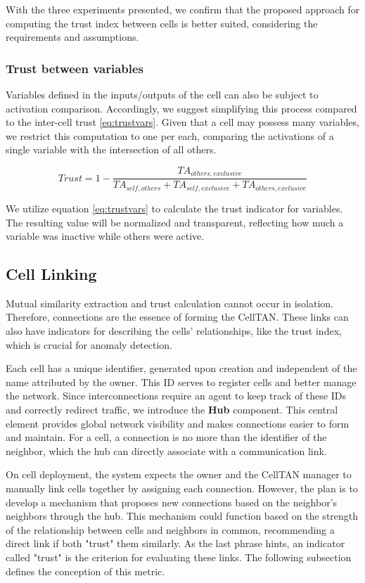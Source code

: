 With the three experiments presented, we confirm that the proposed approach for computing the trust index between cells is better suited, considering the requirements and assumptions.

\subsubsection{Trust between variables}

Variables defined in the inputs/outputs of the cell can also be subject to activation comparison. Accordingly, we suggest simplifying this process compared to the inter-cell trust \ref{eq:trustvars}. Given that a cell may possess many variables, we restrict this computation to one per each, comparing the activations of a single variable with the intersection of all others.

\begin{equation} \label{eq:trustvars}
    Trust = 1 - \frac{TA_{others, exclusive}}{TA_{self,others} + TA_{self, exclusive} + TA_{others, exclusive}}
\end{equation}

We utilize equation \ref{eq:trustvars} to calculate the trust indicator for variables. The resulting value will be normalized and transparent, reflecting how much a variable was inactive while others were active.

\subsection{Cell Linking}

Mutual similarity extraction and trust calculation cannot occur in isolation. Therefore, connections are the essence of forming the CellTAN. These links can also have indicators for describing the cells' relationships, like the trust index, which is crucial for anomaly detection.

Each cell has a unique identifier, generated upon creation and independent of the name attributed by the owner. This ID serves to register cells and better manage the network. Since interconnections require an agent to keep track of these IDs and correctly redirect traffic, we introduce the \textbf{Hub} component. This central element provides global network visibility and makes connections easier to form and maintain. For a cell, a connection is no more than the identifier of the neighbor, which the hub can directly associate with a communication link.

On cell deployment, the system expects the owner and the CellTAN manager to manually link cells together by assigning each connection. However, the plan is to develop a mechanism that proposes new connections based on the neighbor's neighbors through the hub. This mechanism could function based on the strength of the relationship between cells and neighbors in common, recommending a direct link if both "trust" them similarly. As the last phrase hints, an indicator called "trust" is the criterion for evaluating these links. The following subsection defines the conception of this metric.

